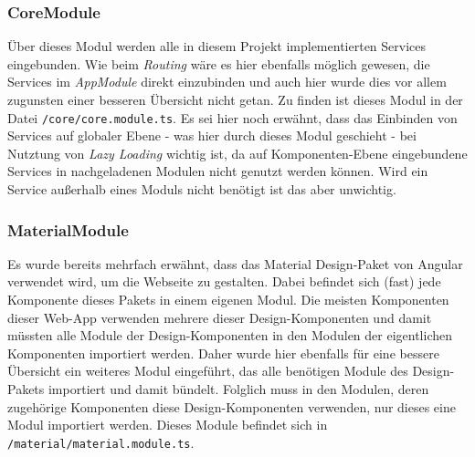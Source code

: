\subsubsection{CoreModule}
\label{sec:prog:modules:core}
Über dieses Modul werden alle in diesem Projekt implementierten Services eingebunden. Wie beim \textit{Routing} wäre es hier ebenfalls möglich gewesen, die Services im \textit{AppModule} direkt einzubinden und auch hier wurde dies vor allem zugunsten einer besseren Übersicht nicht getan.
Zu finden ist dieses Modul in der Datei \texttt{/core/core.module.ts}. Es sei hier noch erwähnt, dass das Einbinden von Services auf globaler Ebene - was hier durch dieses Modul geschieht - bei Nutztung von \textit{Lazy Loading} wichtig ist, da auf Komponenten-Ebene eingebundene Services in nachgeladenen Modulen nicht genutzt werden können. Wird ein Service außerhalb eines Moduls nicht benötigt ist das aber unwichtig\cite{CoreModule}.

\subsubsection{MaterialModule}
\label{sec:prog:modules:material}
Es wurde bereits mehrfach erwähnt, dass das Material Design-Paket von Angular verwendet wird, um die Webseite zu gestalten. Dabei befindet sich (fast) jede Komponente dieses Pakets in einem eigenen Modul. Die meisten Komponenten dieser Web-App verwenden mehrere dieser Design-Komponenten und damit müssten alle Module der Design-Komponenten in den Modulen der eigentlichen Komponenten importiert werden. Daher wurde hier ebenfalls für eine bessere Übersicht ein weiteres Modul eingeführt, das alle benötigen Module des Design-Pakets importiert und damit bündelt. Folglich muss in den Modulen, deren zugehörige Komponenten diese Design-Komponenten verwenden, nur dieses eine Modul importiert werden. Dieses Module befindet sich in \texttt{/material/material.module.ts}.

